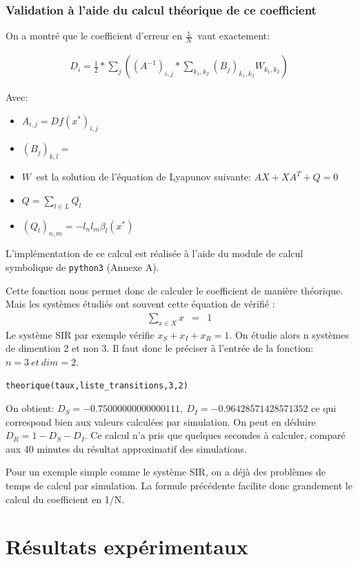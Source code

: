 \documentclass[a4paper,12pt]{report}
\def\D{\displaystyle}
\begin{document}
\subsection{Validation à l'aide du calcul théorique de ce coefficient}
On a montré que le coefficient d'erreur en $\D \frac{1}{N} \ $ vaut
exactement:

\begin{eqnarray*}
  D_i=\frac{1}{2}*\sum_{j}((A^{-1})_{i,j}*\sum_{k_1,k_2}(B_j)_{k_1,k_2}W_{k_1,k_2})
\end{eqnarray*}

Avec:
\begin{itemize}
\item $\D A_{i,j}=Df(x^*)_{i,j}$
\item $\D (B_j)_{k,l}=$
\item $\D W \ $ est la solution de l'équation de Lyapunov suivante: $\D AX+XA^T+Q=0$
\item $\D Q=\sum_{l \in L} Q_l$
\item $\D (Q_l)_{n,m}=-l_nl_m \beta_l(x^*)$
\end{itemize}

L'implémentation de ce calcul est réalisée à l'aide du module de
calcul symbolique de \texttt{python3} (Annexe A).

Cette fonction nous permet donc de calculer le coefficient de manière
théorique. Mais les systèmes étudiés ont souvent cette équation de
vérifié :
\begin{eqnarray*}
  \sum_{x \in X}x &=& 1
\end{eqnarray*}
Le système SIR par exemple vérifie $\D x_S+x_I+x_R=1$. On étudie alors n
systèmes de dimention 2 et non 3. Il faut donc le préciser à l'entrée
de la fonction: $\D n=3 \ et \ dim=2$.

\begin{lstlisting}[frame=single]
  theorique(taux,liste_transitions,3,2)
\end{lstlisting}

On obtient: $\D D_S=-0.75000000000000111,\ D_I=-0.96428571428571352$ 
ce qui correspond bien aux valeurs calculées par simulation. On peut
en déduire $\D D_R=1-D_S-D_I$.  Ce calcul
n'a pris que quelques secondes à calculer, comparé aux 40 minutes du
résultat approximatif des simulations.

Pour un exemple simple comme le système SIR, on a déjà des problèmes de
temps de calcul par simulation. La formule précédente facilite donc
grandement le calcul du coefficient en 1/N.


\chapter{Résultats expérimentaux}
\end{document}
